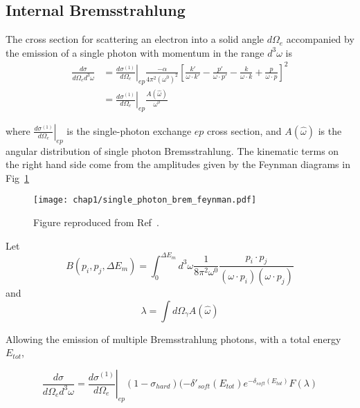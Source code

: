 \subsection{Internal Bremsstrahlung}
The cross section for scattering an electron into a solid angle $d\Omega_e$
accompanied by the emission of a single photon with momentum in the range
$d^3\omega$ is
\begin{align}
    \frac{d\sigma}{d\Omega_e d^3\omega} &=
        \left.\frac{d \sigma^{(1)}}{d \Omega_{e}}\right|_{e p}
        \frac{-\alpha}{4 \pi^{2} (\omega^{0})^2}
        \left[ \frac{k'}{\omega \cdot k'} -
                \frac{p'}{\omega \cdot p'} -
               \frac{k}{\omega \cdot k} +
               \frac{p}{\omega \cdot p}
        \right]^2 \\
     &= \left. \frac{d\sigma^{(1)}}{d\Omega_e}\right|_{ep}
         \frac{A(\hat{\omega})}{\omega^0}
\end{align}

where $\left. \frac{d\sigma^{(1)}}{d\Omega_e}\right|_{ep}$ is the single-photon
exchange $ep$ cross section,
and $A(\hat{\omega})$ is the angular distribution of single photon Bremsstrahlung.
The kinematic terms on the right hand side come from the
amplitudes given by the Feynman diagrams in Fig~\ref{fig:single_photon_brem_feynman}

\begin{figure}[!h]
    \centering
    \texttt{[image: chap1/single\_photon\_brem\_feynman.pdf]}
    \caption{
             Figure reproduced from Ref~\cite{Ent_2001}.
             }
    \label{fig:single_photon_brem_feynman}
\end{figure}

Let
\begin{equation}
    B(p_i, p_j, \Delta E_m) = \int_0^{\Delta E_m} d^3 \omega
    \frac{1}{8\pi^2\omega^0}
    \frac{p_i \cdot p_j}{(\omega \cdot p_i)(\omega \cdot p_j)}
\end{equation}
and
\begin{equation}
    \lambda = \int d\Omega_\gamma A(\hat{\omega})
\end{equation}

Allowing the emission of multiple Bremsstrahlung photons, with a total energy
$E_{tot}$,

\begin{equation}
    \frac{d\sigma}{d\Omega_e d^3\omega} =
        \left.\frac{d \sigma^{(1)}}{d \Omega_{e}}\right|_{e p}
        (1-\sigma_{hard})
        (-\delta'_{soft}(E_{tot})
        e^{-\delta_{soft}(E_{tot})}
        F(\lambda)
\end{equation}

